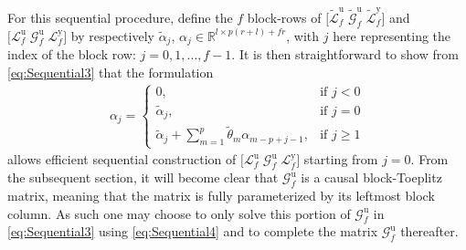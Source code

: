 For this sequential procedure, define the $f$ block-rows of $\big[\widetilde{\mathcal{L}}^\mathrm{u}_f \; \widetilde{\mathcal{G}}^\mathrm{u}_f \; \widetilde{\mathcal{L}}^\mathrm{y}_f\big]$ and $\big[\mathcal{L}^\mathrm{u}_f \; \mathcal{G}^\mathrm{u}_f \; \mathcal{L}^\mathrm{y}_f\big]$ by respectively $\tilde{\alpha}_j$, ${\alpha_j\in\mathbb{R}^{l\times p(r+l)+fr}}$, with $j$ here representing the index of the block row: $j=0,1,\dots,f-1$. It is then straightforward to show from \eqref{eq:Sequential3} that the formulation
\begin{align}\label{eq:Sequential4}
    \alpha_j=
    \left\{\begin{array}{ll}
    0          ,     & \text{if } j<0 \\
    \tilde{\alpha}_j,& \text{if } j=0 \\
    \tilde{\alpha}_j + \sum\limits_{m=1}^{p}\tilde{\theta}_m\alpha_{m-p+j-1}, & \text{if } j \geq 1
    \end{array}\right.
\end{align}
 allows efficient sequential construction of $\big[\mathcal{L}^\mathrm{u}_f \; \mathcal{G}^\mathrm{u}_f \; \mathcal{L}^\mathrm{y}_f\big]$ starting from $j=0$. From the subsequent section, it will become clear that $\mathcal{G}^\mathrm{u}_f$ is a causal block-Toeplitz matrix, meaning that the matrix is fully parameterized by its leftmost block column. As such one may choose to only solve this portion of $\mathcal{G}^\mathrm{u}_f$ in \eqref{eq:Sequential3} using \eqref{eq:Sequential4} and to complete the matrix $\mathcal{G}^\mathrm{u}_f$ thereafter.